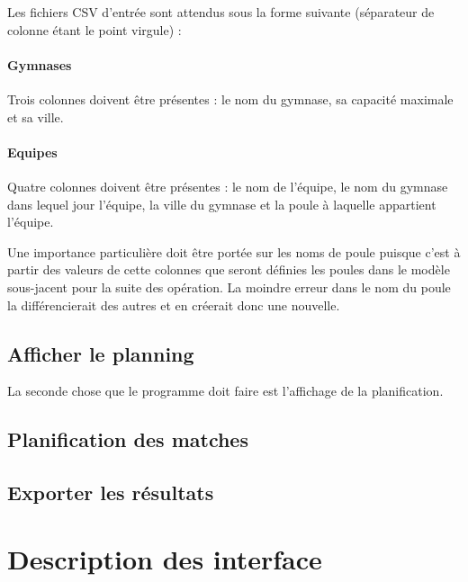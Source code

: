 \documentclass[final, noposter]{polytech/polytech}
\begin{document}
			Les fichiers CSV d'entrée sont attendus sous la forme suivante (séparateur de colonne étant le point virgule) :

			\paragraph{Gymnases}
				Trois colonnes doivent être présentes : le nom du gymnase, sa capacité maximale et sa ville.
				

			\paragraph{Equipes}
				Quatre colonnes doivent être présentes : le nom de l'équipe, le nom du gymnase dans lequel jour l'équipe, la ville du gymnase et la poule à laquelle appartient l'équipe.
				

				Une importance particulière doit être portée sur les noms de poule puisque c'est à partir des valeurs de cette colonnes que seront définies les poules dans le modèle sous-jacent pour la suite des opération. La moindre erreur dans le nom du poule la différencierait des autres et en créerait donc une nouvelle.

		\subsection{Afficher le planning}
			La seconde chose que le programme doit faire est l'affichage de la planification.

		\subsection{Planification des matches}

		\subsection{Exporter les résultats}

	\section{Description des interface}
		
\end{document}
